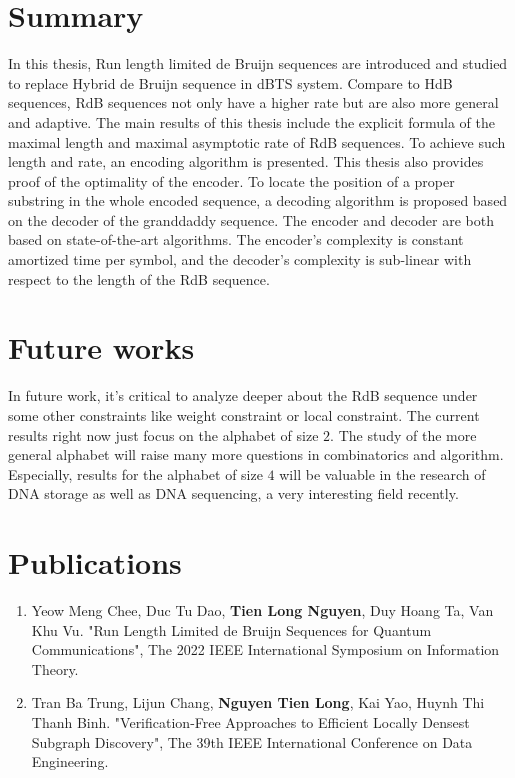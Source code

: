 \section*{Summary}
In this thesis, Run length limited de Bruijn sequences are introduced and studied to replace Hybrid de Bruijn sequence in \gls{dBTS} system. Compare to \gls{HdB} sequences, \gls{RdB} sequences not only have a higher rate but are also more general and adaptive. The main results of this thesis include the explicit formula of the maximal length and maximal asymptotic rate of \gls{RdB} sequences. To achieve such length and rate, an encoding algorithm is presented. This thesis also provides proof of the optimality of the encoder. To locate the position of a proper substring in the whole encoded sequence, a decoding algorithm is proposed based on the decoder of the granddaddy sequence. The encoder and decoder are both based on state-of-the-art algorithms. The encoder's complexity is constant amortized time per symbol, and the decoder's complexity is sub-linear with respect to the length of the \gls{RdB} sequence. 

\section*{Future works}
In future work, it's critical to analyze deeper about the RdB sequence under some other constraints like weight constraint or local constraint. The current results right now just focus on the alphabet of size $2$. The study of the more general alphabet will raise many more questions in combinatorics and algorithm. Especially, results for the alphabet of size $4$ will be valuable in the research of DNA storage as well as DNA sequencing, a very interesting field recently.

\section*{Publications}
\begin{enumerate}
    \item Yeow Meng Chee, Duc Tu Dao, \textbf{Tien Long Nguyen}, Duy Hoang Ta, Van Khu Vu. "Run Length Limited de Bruijn Sequences for Quantum Communications", The 2022 IEEE International Symposium on Information Theory.
    \item Tran Ba Trung, Lijun Chang, \textbf{Nguyen Tien Long}, Kai Yao, Huynh Thi Thanh Binh. "Verification-Free Approaches to Efficient Locally Densest Subgraph Discovery", The 39th IEEE International Conference on Data Engineering.
\end{enumerate}



